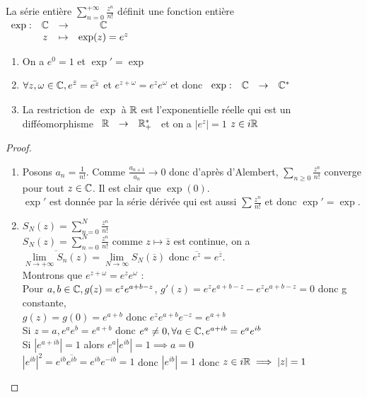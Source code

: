 \documentclass[]{report}
\begin{document}
\begin{prop}
    La série entière $\sum_{n=0}^{+\infty}\frac{z^n}{n!}$ définit une fonction entière $\begin{array}{ccccc}
\exp : & \mathbb{C} & \to & \mathbb{C} \\
  & z & \mapsto & \exp (z)=e^z   
\end{array}$\\
\begin{enumerate}
    \item On a $e^0=1$ et $\exp'=\exp$
    \item $\forall z, \omega \in \mathbb{C}, e^{\bar{z}}=\bar{e^z} $ et  $e^{z+\omega}=e^ze^\omega$ et donc $\begin{array}{ccccc}
\exp : & \mathbb{C} & \to & \mathbb{C}^*
\end{array}$
    \item La restriction de $\exp$ à $\mathbb{R}$ est l'exponentielle réelle qui est un difféomorphisme $\begin{array}{ccccc}
\mathbb{R} & \to &  \mathbb{R}_+^*
\end{array}$ et on a $|e^z|=1$ \ssi $z\in i\mathbb{R}$
\end{enumerate}
\end{prop}

\begin{proof}
    \begin{enumerate}
        \item Posons $a_n=\frac{1}{n!}$. Comme $\frac{a_{n+1}}{a_n} \longrightarrow 0$ donc d'après d'Alembert, $\sum_{n\ge0}\frac{z^n}{n!}$ converge pour tout $z\in\mathbb{C}$. Il est clair que $\exp(0)$.\\
        $\exp'$ est donnée par la série dérivée qui est aussi $\sum\frac{z^n}{n!}$ et donc $\exp'=\exp$.
        \item $S_N(z)=\sum_{n=0}^N\frac{z^n}{n!}$\\
        $S_N(z)=\sum_{n=0}^N\frac{z^n}{n!}$ comme $z \mapsto \bar{z}$ est continue, on a $\overline{\lim\limits_{N\to+\infty}S_n(z)}=\lim\limits_{N\to \infty}S_N(\overline{z})$ donc $\overline{e^z}=e^{\bar{z}}$.\\
        Montrons que $e^{z+\omega}=e^ze^\omega$ :\\
        Pour $a,b\in \mathbb{C},g(z)=e^ze^{a+b-z}$, $g'(z)=e^ze^{a+b-z}-e^ze^{a+b-z}=0$ donc g constante, \\$g(z)=g(0)=e^{a+b}$ donc $e^ze^{a+b}e^{-z}=e^{a+b}$\\
        Si $z=a,e^ae^b=e^{a+b}$ donc $e^a\neq0, \forall a\in\mathbb{C}, e^{a+ib}=e^ae^{ib}$\\
        Si $|e^{a+ib}|=1$ alors $e^a|e^{ib}|=1\implies a=0$\\
        $|e^{ib}|^2=e^{ib}\overline{e^{ib}}=e^{ib}e^{-ib}=1$ donc $|e^{ib}|=1$ donc $z\in i\mathbb{R}\implies |z|=1$
    \end{enumerate}
\end{proof}
\end{document}
